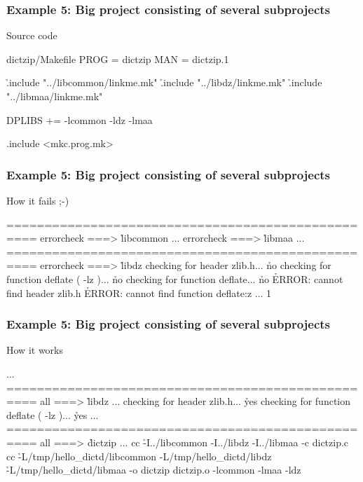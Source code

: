\documentclass[hyperref={colorlinks=true}]{beamer}
\begin{document}
\begin{frame}[fragile]
  \frametitle{Example 5: Big project consisting of several subprojects}

  \begin{block}{Source code}
  \begin{Code}{dictzip/Makefile}
PROG =   dictzip
MAN =    dictzip.1

\h{.include} "../libcommon/linkme.mk"
\h{.include} "../libdz/linkme.mk"
\h{.include} "../libmaa/linkme.mk"

DPLIBS +=        -lcommon -ldz -lmaa

.include <mkc.prog.mk>
  \end{Code}
  \end{block}
\end{frame}

\begin{frame}[fragile]
  \frametitle{Example 5: Big project consisting of several subprojects}

  \begin{block}{How it fails ;-)}
  \begin{CodeNoLabel}
==================================================
errorcheck ===> \h{libcommon}
...
errorcheck ===> \h{libmaa}
...
==================================================
errorcheck ===> \h{libdz}
checking for header zlib.h... \h{no}
checking for function deflate ( -lz )... \h{no}
checking for function deflate... \h{no}
\h{ERROR: cannot find header zlib.h}
\h{ERROR: cannot find function deflate:z}
...
1
\prompt{\$}
  \end{CodeNoLabel}
  \end{block}
\end{frame}

\begin{frame}[fragile]
  \frametitle{Example 5: Big project consisting of several subprojects}

  \begin{block}{How it works}
  \begin{CodeNoLabel}
...
==================================================
all ===> \h{libdz}
...
checking for header zlib.h... \h{yes}
checking for function deflate ( -lz )... \h{yes}
...
==================================================
all ===> \h{dictzip}
...
cc \h{-I../libcommon -I../libdz -I../libmaa} -c dictzip.c
cc \h{-L/tmp/hello\_dictd/libcommon -L/tmp/hello\_dictd/libdz}
   \h{-L/tmp/hello\_dictd/libmaa}  -o dictzip
   dictzip.o -lcommon -lmaa -ldz
\prompt{\$}
  \end{CodeNoLabel}
  \end{block}
\end{frame}
\end{document}
